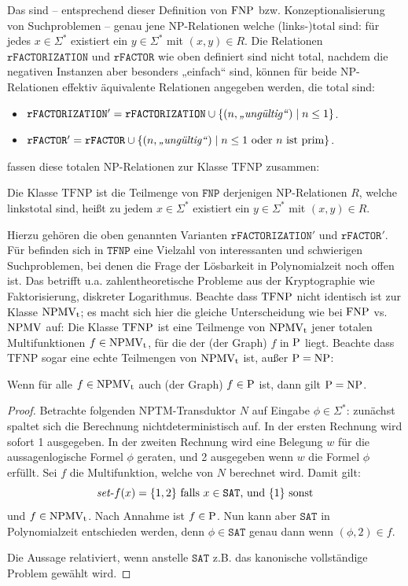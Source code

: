 Das sind -- entsprechend dieser Definition von $\FNP$ bzw. Konzeptionalisierung von Suchproblemen -- genau jene NP-Relationen welche (links-)total sind: für jedes $x\in\Sigma^*$ existiert ein $y\in\Sigma^*$ mit $(x,y)\in R$. 
Die Relationen $\mathtt{rFACTORIZATION}$ und $\mathtt{rFACTOR}$ wie oben definiert sind nicht total, nachdem die negativen Instanzen aber besonders „einfach“ sind, können für beide NP-Relationen effektiv äquivalente Relationen angegeben werden, die total sind:
\begin{itemize} \item $\mathtt{rFACTORIZATION}' = \mathtt{rFACTORIZATION} \cup \{ (n, \text{\emph{„ungültig“}}) \mid n\leq 1 \}$.
    \item $\mathtt{rFACTOR}' = \mathtt{rFACTOR} \cup \{ (n, \text{\emph{„ungültig“}}) \mid n\leq 1 \text{ oder $n$ ist prim} \}$.
\end{itemize}
\textcite{megiddo_total_1991} fassen diese totalen NP-Relationen zur Klasse $\mathrm{TFNP}$ zusammen:
\begin{definition}
    Die Klasse $\mathrm{TFNP}$ ist die Teilmenge von $\mathtt{FNP}$ derjenigen NP-Relationen $R$, welche linkstotal sind, heißt zu jedem $x\in\Sigma^*$ existiert ein $y\in\Sigma^*$ mit $(x,y)\in R$.
\end{definition}
Hierzu gehören die oben genannten Varianten $\mathtt{rFACTORIZATION}'$ und $\mathtt{rFACTOR}'$.
Für \citeauthor{megiddo_total_1991} befinden sich in $\mathtt{TFNP}$ eine Vielzahl von interessanten und schwierigen Suchproblemen, bei denen die Frage der Lösbarkeit in Polynomialzeit noch offen ist.
Das betrifft u.a. zahlentheoretische Probleme aus der Kryptographie wie Faktorisierung, diskreter Logarithmus. Beachte dass $\TFNP$ nicht identisch ist zur Klasse $\NPMVt$; es macht sich hier die gleiche Unterscheidung wie bei $\FNP$ vs. $\NPMV$ auf: Die Klasse $\TFNP$ ist eine Teilmenge von $\NPMVt$ jener totalen Multifunktionen $f\in\NPMVt$, für die der (der Graph) $f$ in $\P$ liegt.
Beachte dass $\mathrm{TFNP}$ sogar eine echte Teilmengen von $\NPMVt$ ist, außer $\P=\NP$:
\begin{observation}
    Wenn für alle $f\in\NPMVt$ auch (der Graph) $f\in \P$ ist, dann gilt $\P=\NP$.
\end{observation}
\begin{proof}
    Betrachte folgenden NPTM-Transduktor $N$ auf Eingabe $\phi\in\Sigma^*$: zunächst spaltet sich die Berechnung nichtdeterministisch auf. In der ersten Rechnung wird sofort 1 ausgegeben. In der zweiten Rechnung wird eine Belegung $w$ für die aussagenlogische Formel $\phi$ geraten, und 2 ausgegeben wenn $w$ die Formel $\phi$ erfüllt. Sei $f$ die Multifunktion, welche von $N$ berechnet wird.
    Damit gilt:
    \[ \fset{}f(x) = \{ 1, 2\} \text{ falls $x\in\mathtt{SAT}$, und } \{ 1\} \text{ sonst} \]
    und $f\in\NPMVt$.
    Nach Annahme ist $f\in \P$. Nun kann aber $\mathtt{SAT}$ in Polynomialzeit entschieden werden, denn $\phi\in\mathtt{SAT}$ genau dann wenn $(\phi, 2) \in f$.

    Die Aussage relativiert, wenn anstelle $\mathtt{SAT}$ z.B. das kanonische vollständige Problem gewählt wird.
\end{proof}

